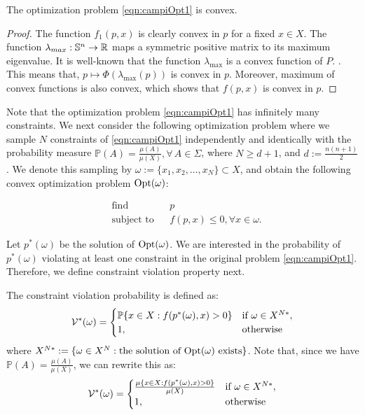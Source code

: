 \begin{proposition}The optimization problem \eqref{eqn:campiOpt1} is convex.
\end{proposition}

\begin{proof}The function $f_1(p,x)$ is clearly convex in $p$ for a fixed $x \in X$. The function 
$\lambda_{max}: \mathbb{S}^n \to \mathbb{R}$ maps a symmetric positive matrix to its maximum eigenvalue. It is well-known that the function $\lambda_{\max}$ is a convex function of $P$. \cite{boyd}. This means that, $p \mapsto \Phi(\lambda_{\max}(p))$ is convex in $p$. Moreover, maximum of convex functions is also convex, which shows that $f(p, x)$ is convex in $p$.
\end{proof}

Note that the optimization problem \eqref{eqn:campiOpt1} has infinitely many constraints. We next consider the following optimization problem where we sample $N$ constraints of \eqref{eqn:campiOpt1} independently and identically with the probability measure
$\mathbb{P}(A) = \frac{\mu(A)}{\mu(X)}, \forall\, A \in \Sigma$, where $N \geq d+1$, and $d := \frac{n(n+1)}{2}$. We denote this sampling by $\omega:=\{x_1, x_2, \ldots, x_N\} \subset X$, and obtain the following convex optimization problem $\text{Opt}(\omega)$: 

\begin{equation}
\label{eqn:campiOpt2}
\begin{aligned}
& \text{find} & & p \\
& \text{subject to} 
& & f(p, x) \leq 0, \forall x \in \omega. \end{aligned}
\end{equation}

Let $p^*(\omega)$ be the solution of $\text{Opt}(\omega)$. We are interested in the probability of $p^*(\omega)$ violating at least one constraint in the original problem \eqref{eqn:campiOpt1}. Therefore, we define constraint violation property next.

\begin{definition} The constraint violation probability is defined as:
\begin{equation*}
\mathcal{V}^*(\omega)=
    \begin{cases}
      \mathbb{P}\{x \in X: f(p^*(\omega), x) > 0\} &\text{if}\,\, \omega \in X^{N*},\\
      1, & \text{otherwise}
    \end{cases}
\end{equation*}
where $X^{N*}:=\{\omega \in X^N: \text{the solution of $\text{Opt}(\omega)$ exists}\}$. 
Note that, since we have $\mathbb{P}(A) = \frac{\mu(A)}{\mu(X)}$, we can rewrite this as:
\begin{equation*}
\mathcal{V}^*(\omega)=
    \begin{cases}
      \frac{\mu\{x \in X: f(p^*(\omega), x) > 0\}}{\mu(X)} &\text{if}\,\, \omega \in X^{N*},\\
      1, & \text{otherwise}
    \end{cases}
\end{equation*}
\end{definition}

